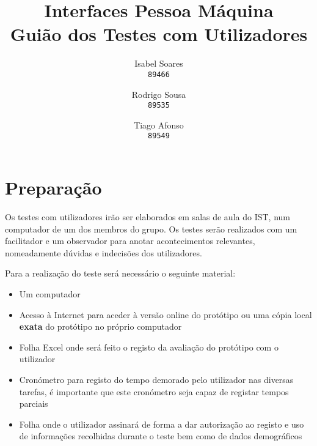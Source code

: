 \documentclass[12pt]{article}
\author{
  Isabel Soares\\
  \texttt{89466}
  \and
  Rodrigo Sousa\\
  \texttt{89535}
  \and
  Tiago Afonso\\
  \texttt{89549}
}
\title{Interfaces Pessoa Máquina\\
Guião dos Testes com Utilizadores}
\begin{document}
    

\maketitle

\section*{Preparação}
    Os testes com utilizadores irão ser elaborados em salas de aula do IST, num computador de um dos membros do grupo. Os testes serão realizados com um facilitador e um observador para anotar acontecimentos relevantes, nomeadamente dúvidas e indecisões dos utilizadores.
    
    Para a realização do teste será necessário o seguinte material:
    
    \begin{itemize}
        \item Um computador
        \item Acesso à Internet para aceder à versão online do protótipo ou uma cópia local \textbf{exata} do protótipo no próprio computador
        \item Folha Excel onde será feito o registo da avaliação do protótipo com o utilizador
        \item Cronómetro para registo do tempo demorado pelo utilizador nas diversas tarefas, é importante que este cronómetro seja capaz de registar tempos parciais
        \item Folha onde o utilizador assinará de forma a dar autorização ao registo e uso de informações recolhidas durante o teste bem como de dados demográficos
    \end{itemize}
\end{document}
